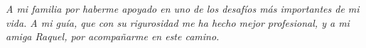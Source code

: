 \documentclass[11pt,twoside]{amsbook}
\numberwithin{section}{chapter}%
\numberwithin{equation}{chapter}%
\numberwithin{figure}{chapter}%
\begin{document}
\frontmatter




\cleardoublepage%
\thispagestyle{empty}
\vspace*{13.5pc}
\begin{center}
 \emph{\large A mi familia por haberme apoyado en uno de los desaf\'ios m\'as importantes de mi vida. A mi gu\'ia, que con su rigurosidad me ha hecho mejor profesional, y a mi amiga Raquel, por acompa\~narme en este camino. }\\[2pt]
\end{center}
\cleardoublepage


\setcounter{page}{1}

%


\tableofcontents
\listoftables
\listoffigures

\renewcommand{\chaptermark}[1]{\markboth{\MakeUppercase{#1}}{}}
\renewcommand{\sectionmark}[1]{\markright{\MakeUppercase{#1}}{}}


\mainmatter






%



\appendix


\backmatter


\printindex
\end{document}
